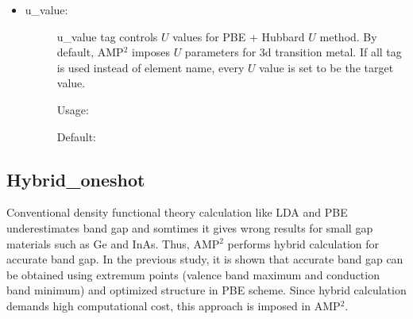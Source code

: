 \documentclass[letterpaper,10pt,english]{sphinxmanual}
\begin{document}
\begin{itemize}
\begin{description}
\begin{sphinxVerbatim}[commandchars=\\\{\}]
\end{sphinxVerbatim}

\end{description}

\item {} \begin{description}
\item[{u\_value:}] \leavevmode
u\_value tag controls \(U\) values for PBE + Hubbard \(U\) method. By default, AMP$^{\text{2}}$ imposes \(U\) parameters for 3d
transition metal. If all tag is used instead of element name, every \(U\) value is set to be the target value.

Usage:

\begin{sphinxVerbatim}[commandchars=\\\{\}]
     \PYG{p}{[} \PYG{p}{]} 
\end{sphinxVerbatim}

Default:

\begin{sphinxVerbatim}[commandchars=\\\{\}]
     
     
     
     
     
     
     
     
\end{sphinxVerbatim}

\end{description}

\end{itemize}


\subsection{Hybrid\_oneshot}
\label{\detokenize{Input/Configuration:hybrid-oneshot}}
Conventional density functional theory calculation like LDA and PBE underestimates band gap and somtimes it gives
wrong results for small gap materials such as Ge and InAs. Thus, AMP$^{\text{2}}$ performs hybrid calculation for accurate band gap.
In the previous study, it is shown that accurate band gap can be obtained using extremum points (valence band maximum and
conduction band minimum) and optimized structure in PBE scheme. Since hybrid calculation demands high computational cost,
this approach is imposed in AMP$^{\text{2}}$.
\end{document}
